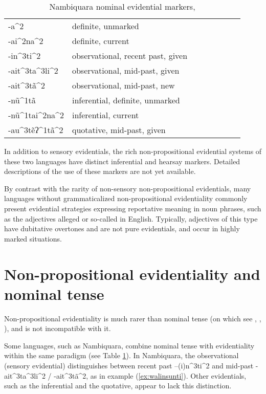 \documentclass[oneside,a4paper,11pt]{article}
\newcommand{\ipa}[1]{{\phon \mbox{#1}}} %
\begin{document}
 \begin{table}[H]
 \caption{Nambiquara nominal evidential markers, \citet[282]{lowe99nambiquara} } \centering \label{tab:nambiquara}
\begin{tabular}{llllllll}
\toprule
\ipa{-a^2} & definite, unmarked \\
\ipa{-ai^2na^2} & definite, current \\
\ipa{-in^3ti^2} & observational, recent past, given \\
\ipa{-ait^3ta^3li^2} & observational, mid-past, given \\
\ipa{-ait^3tã^2} & observational, mid-past, new \\
\ipa{-nũ^1tã} & inferential, definite, unmarked \\
\ipa{-nũ^1tai^2na^2} & inferential, current \\
\ipa{-au^3tẽʔ^1tã^2} & quotative, mid-past, given \\
\bottomrule
\end{tabular}
\end{table}

In addition to sensory evidentials, the rich non-propositional evidential systems of these two languages have distinct inferential and hearsay markers. Detailed descriptions of the use of these markers are not yet available.

By contrast with the rarity of non-sensory non-propositional evidentials, many languages without grammaticalized  non-propositional evidentiality commonly present evidential strategies expressing reportative meaning in noun phrases, such as the adjectives \ipa{alleged} or \ipa{so-called} in English. Typically, adjectives of this type have dubitative overtones and are not pure evidentials, and occur in highly marked situations.

\section{Non-propositional evidentiality and nominal tense} \label{sec:tense}

Non-propositional evidentiality is much rarer than nominal tense (on which see \citealt{nordlinger04nominal}, \citealt{haude04tense}, \citealt[132]{francois05overview}), and is not incompatible with it.


Some languages, such as Nambiquara, combine nominal tense with evidentiality within the same paradigm (see Table \ref{tab:nambiquara}). In Nambiquara,  the observational (sensory evidential)  distinguishes between recent past \ipa{--(i)n^3ti^2} and mid-past \ipa{-ait^3ta^3li^2} /
\ipa{-ait^3tã^2}, as in example (\ref{ex:walinsunti}). Other evidentials, such as the inferential and the quotative, appear to lack this distinction.
\end{document}
